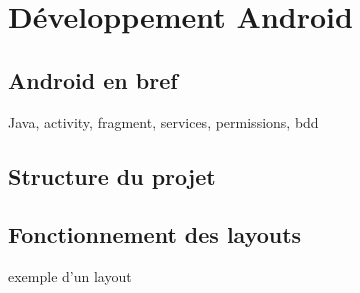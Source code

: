 \chapter{Développement Android}
\section{Android en bref}
Java, activity, fragment, services, permissions, bdd
\section{Structure du projet}

\section{Fonctionnement des layouts}
exemple d'un layout

\section{}


